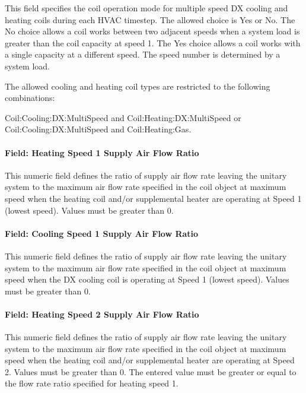 This field specifies the coil operation mode for multiple speed DX cooling and heating coils during each HVAC timestep. The allowed choice is Yes or No. The No choice allows a coil works between two adjacent speeds when a system load is greater than the coil capacity at speed 1. The Yes choice allows a coil works with a single capacity at a different speed. The speed number is determined by a system load.

The allowed cooling and heating coil types are restricted to the following combinations:

Coil:Cooling:DX:MultiSpeed and Coil:Heating:DX:MultiSpeed or Coil:Cooling:DX:MultiSpeed and Coil:Heating:Gas. 

\paragraph{Field: Heating Speed 1 Supply Air Flow Ratio}\label{field-heating-speed-1-supply-air-flow-ratio}

This numeric field defines the ratio of supply air flow rate leaving the unitary system to the maximum air flow rate specified in the coil object at maximum speed when the heating coil and/or supplemental heater are operating at Speed 1 (lowest speed). Values must be greater than 0.

\paragraph{Field: Cooling Speed 1 Supply Air Flow Ratio}\label{field-cooling-speed-1-supply-air-flow-ratio}

This numeric field defines the ratio of supply air flow rate leaving the unitary system to the maximum air flow rate specified in the coil object at maximum speed when the DX cooling coil is operating at Speed 1 (lowest speed). Values must be greater than 0.

\paragraph{Field: Heating Speed 2 Supply Air Flow Ratio}\label{field-heating-speed-2-supply-air-flow-ratio}

This numeric field defines the ratio of supply air flow rate leaving the unitary system to the maximum air flow rate specified in the coil object at maximum speed when the heating coil and/or supplemental heater are operating at Speed 2. Values must be greater than 0. The entered value must be greater or equal to the flow rate ratio specified for heating speed 1.

